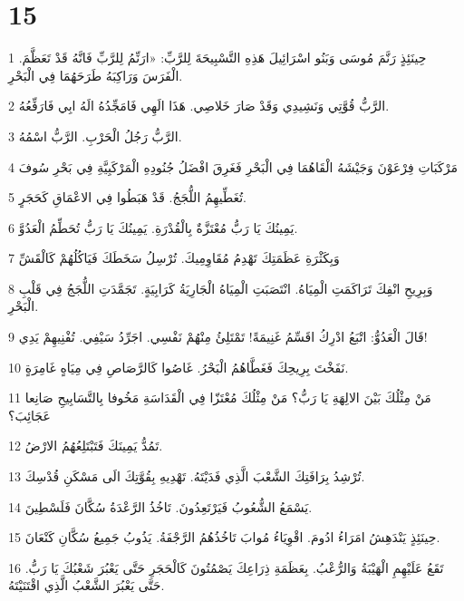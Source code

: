 \chapter{15}

\par 1 حِينَئِذٍ رَنَّمَ مُوسَى وَبَنُو اسْرَائِيلَ هَذِهِ التَّسْبِيحَةَ لِلرَّبِّ: «ارَنِّمُ لِلرَّبِّ فَانَّهُ قَدْ تَعَظَّمَ. الْفَرَسَ وَرَاكِبَهُ طَرَحَهُمَا فِي الْبَحْرِ.
\par 2 الرَّبُّ قُوَّتِي وَنَشِيدِي وَقَدْ صَارَ خَلاصِي. هَذَا الَهِي فَامَجِّدُهُ الَهُ ابِي فَارَفِّعُهُ.
\par 3 الرَّبُّ رَجُلُ الْحَرْبِ. الرَّبُّ اسْمُهُ.
\par 4 مَرْكَبَاتِ فِرْعَوْنَ وَجَيْشَهُ الْقَاهُمَا فِي الْبَحْرِ فَغَرِقَ افْضَلُ جُنُودِهِ الْمَرْكَبِيَّةِ فِي بَحْرِ سُوفَ
\par 5 تُغَطِّيهِمُ اللُّجَجُ. قَدْ هَبَطُوا فِي الاعْمَاقِ كَحَجَرٍ.
\par 6 يَمِينُكَ يَا رَبُّ مُعْتَزَّةٌ بِالْقُدْرَةِ. يَمِينُكَ يَا رَبُّ تُحَطِّمُ الْعَدُوَّ.
\par 7 وَبِكَثْرَةِ عَظَمَتِكَ تَهْدِمُ مُقَاوِمِيكَ. تُرْسِلُ سَخَطَكَ فَيَاكُلُهُمْ كَالْقَشِّ
\par 8 وَبِرِيحِ انْفِكَ تَرَاكَمَتِ الْمِيَاهُ. انْتَصَبَتِ الْمِيَاهُ الْجَارِيَةُ كَرَابِيَةٍ. تَجَمَّدَتِ اللُّجَجُ فِي قَلْبِ الْبَحْرِ.
\par 9 قَالَ الْعَدُوُّ: اتْبَعُ ادْرِكُ اقَسِّمُ غَنِيمَةً! تَمْتَلِئُ مِنْهُمْ نَفْسِي. اجَرِّدُ سَيْفِي. تُفْنِيهِمْ يَدِي!
\par 10 نَفَخْتَ بِرِيحِكَ فَغَطَّاهُمُ الْبَحْرُ. غَاصُوا كَالرَّصَاصِ فِي مِيَاهٍ غَامِرَةٍ.
\par 11 مَنْ مِثْلُكَ بَيْنَ الالِهَةِ يَا رَبُّ؟ مَنْ مِثْلُكَ مُعْتَزّا فِي الْقَدَاسَةِ مَخُوفا بِالتَّسَابِيحِ صَانِعا عَجَائِبَ؟
\par 12 تَمُدُّ يَمِينَكَ فَتَبْتَلِعُهُمُ الارْضُ.
\par 13 تُرْشِدُ بِرَافَتِكَ الشَّعْبَ الَّذِي فَدَيْتَهُ. تَهْدِيهِ بِقُوَّتِكَ الَى مَسْكَنِ قُدْسِكَ.
\par 14 يَسْمَعُ الشُّعُوبُ فَيَرْتَعِدُونَ. تَاخُذُ الرَّعْدَةُ سُكَّانَ فَلَسْطِينَ.
\par 15 حِينَئِذٍ يَنْدَهِشُ امَرَاءُ ادُومَ. اقْوِيَاءُ مُوابَ تَاخُذُهُمُ الرَّجْفَةُ. يَذُوبُ جَمِيعُ سُكَّانِ كَنْعَانَ.
\par 16 تَقَعُ عَلَيْهِمِ الْهَيْبَةُ وَالرُّعْبُ. بِعَظَمَةِ ذِرَاعِكَ يَصْمُتُونَ كَالْحَجَرِ حَتَّى يَعْبُرَ شَعْبُكَ يَا رَبُّ. حَتَّى يَعْبُرَ الشَّعْبُ الَّذِي اقْتَنَيْتَهُ.
